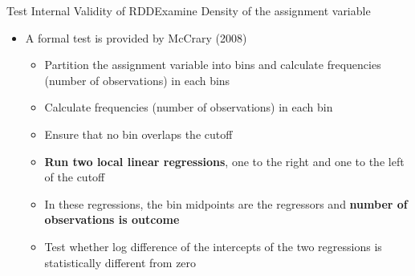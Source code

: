 \documentclass[hyperref={pdfpagelabels=false}]{beamer}
\begin{document}
\begin{frame}{Test Internal Validity of RDD}{Examine Density of the assignment variable}
	
	
	\begin{itemize}
		\vspace{0.2cm}	
		\item A formal test is provided by McCrary (2008)
		\vspace{0.2cm}		
		\begin{itemize}
			\item[1] Partition the assignment variable into bins and calculate frequencies (number of observations) in each bins
			\vspace{0.2cm}
			\item[2] Calculate frequencies (number of observations) in each bin	 
			\vspace{0.2cm}
			\item[3] Ensure that no bin overlaps the cutoff
			\vspace{0.2cm}
			\item[4] \textbf{Run two local linear regressions}, one to the right and one to the left of the cutoff
			\vspace{0.2cm}
			\item[5] In these regressions,  the bin midpoints
			are the regressors and \textbf{number of observations is outcome}
			\vspace{0.2cm}
			\item[6] Test whether log difference of the intercepts of the two regressions
			is statistically different from zero	
			
			
		\end{itemize}
		
		
		
	\end{itemize}
\end{frame}
\end{document}
